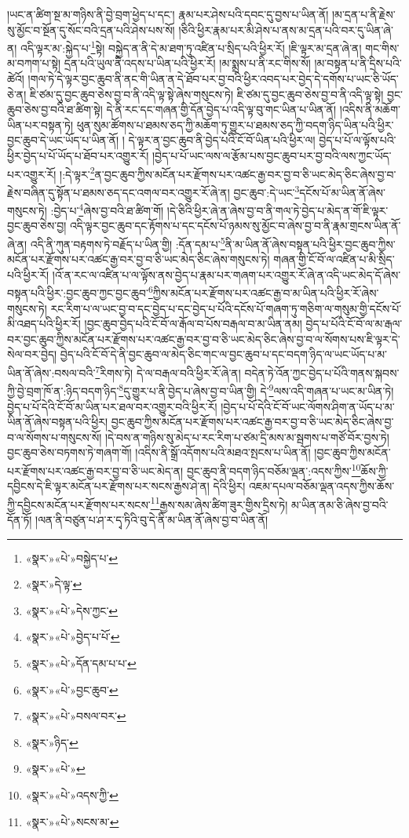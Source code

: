 །ཡང་ན་ཚིག་སྔ་མ་གཉིས་ནི་བྱེ་བྲག་ཕྱེད་པ་དང་། རྣམ་པར་ཤེས་པའི་དབང་དུ་བྱས་པ་ཡིན་ནོ། །མ་དྲན་པ་ནི་རྗེས་སུ་མྱོང་བ་སྔོན་དུ་སོང་བའི་དྲན་པའི་ཤེས་པས་སོ། །ཅིའི་ཕྱིར་རྣམ་པར་མི་ཤེས་པ་ནས་མ་དྲན་པའི་བར་དུ་ཡིན་ཞེ་ན། འདི་ལྟར་མ་:སྐྱེད་པ་\footnote{«སྣར་»«པེ་»བསྐྱེད་པ་}སྟེ། བསྐྱེད་ན་ནི་དེ་མ་ཐག་ཏུ་འཛིན་པ་སྲིད་པའི་ཕྱིར་རོ། །ཇི་ལྟར་མ་དྲན་ཞེ་ན། གང་གིས་མ་བཀག་པ་སྟེ། དྲན་པའི་ཡུལ་ནི་འདས་པ་ཡིན་པའི་ཕྱིར་རོ། །མ་སྨྲས་པ་ནི་རང་གིས་སོ། །མ་བསྟན་པ་ནི་དྲིས་པའི་ཚེའོ། །གལ་ཏེ་དེ་ལྟར་བྱང་ཆུབ་ནི་ནང་གི་ཡིན་ན་དེ་ཐོབ་པར་བྱ་བའི་ཕྱིར་འབད་པར་བྱེད་དེ་དགོས་པ་ཡང་ཅི་ཡོད་ཅེ་ན། ཇི་ཙམ་དུ་བྱང་ཆུབ་ཅེས་བྱ་བ་ནི་འདི་ལྟ་སྟེ་ཞེས་གསུངས་ཏེ། ཇི་ཙམ་དུ་བྱང་ཆུབ་ཅེས་བྱ་བ་ནི་འདི་ལྟ་སྟེ། བྱང་ཆུབ་ཅེས་བྱ་བའི་ཐ་ཚིག་སྟེ། དེ་ནི་རང་དང་གཞན་གྱི་དོན་བྱེད་པ་འདི་ལྟ་བུ་གང་ཡིན་པ་ཡིན་ནོ། །འདིས་ནི་མཆོག་ཡིན་པར་བསྟན་ཏེ། ཕུན་སུམ་ཚོགས་པ་ཐམས་ཅད་ཀྱི་མཆོག་ཏུ་གྱུར་པ་ཐམས་ཅད་ཀྱི་བདག་ཉིད་ཡིན་པའི་ཕྱིར་བྱང་ཆུབ་དེ་ཡང་ཡོད་པ་ཡིན་ནོ། །
དེ་ལྟར་ན་བྱང་ཆུབ་ནི་བྱེད་པའི་ངོ་བོ་ཡིན་པའི་ཕྱིར་ལ། བྱེད་པ་པོ་ལ་ལྟོས་པའི་ཕྱིར་བྱེད་པ་པོ་ཡོད་པ་ཐོབ་པར་འགྱུར་རོ། །བྱེད་པ་པོ་ཡང་ལས་ལ་རྩོམ་པས་བྱང་ཆུབ་པར་བྱ་བའི་ལས་ཀྱང་ཡོད་པར་འགྱུར་རོ། །:དེ་ལྟར་\footnote{«སྣར་»དེ་ལྟ་}ན་བྱང་ཆུབ་ཀྱིས་མངོན་པར་རྫོགས་པར་འཚང་རྒྱ་བར་བྱ་བ་ཅི་ཡང་མེད་ཅིང་ཞེས་བྱ་བ་རྗེས་བཞིན་དུ་སྟོན་པ་ཐམས་ཅད་དང་འགལ་བར་འགྱུར་རོ་ཞེ་ན། བྱང་ཆུབ་:དེ་ཡང་\footnote{«སྣར་»«པེ་»དེས་ཀྱང་}དངོས་པོ་མ་ཡིན་ནོ་ཞེས་གསུངས་ཏེ། :བྱེད་པ་\footnote{«སྣར་»«པེ་»བྱེད་པ་པོ་}ཞེས་བྱ་བའི་ཐ་ཚིག་གོ། །དེ་ཅིའི་ཕྱིར་ཞེ་ན་ཞེས་བྱ་བ་ནི་གལ་ཏེ་བྱེད་པ་མེད་ན་གོ་ཇི་ལྟར་བྱང་ཆུབ་ཅེས་བྱ། འདི་ལྟར་བྱང་ཆུབ་དང་རྟོགས་པ་དང་དངོས་པོ་ཉམས་སུ་མྱོང་བ་ཞེས་བྱ་བ་ནི་རྣམ་གྲངས་ཡིན་ནོ་ཞེ་ན། འདི་ནི་ཀུན་བརྟགས་ཏེ་བརྗོད་པ་ཡིན་གྱི། :དོན་དམ་པ་\footnote{«སྣར་»«པེ་»དོན་དམ་པ་པ་}ནི་མ་ཡིན་ནོ་ཞེས་བསྟན་པའི་ཕྱིར་བྱང་ཆུབ་ཀྱིས་མངོན་པར་རྫོགས་པར་འཚང་རྒྱ་བར་བྱ་བ་ཅི་ཡང་མེད་ཅིང་ཞེས་གསུངས་ཏེ། གཞན་གྱི་ངོ་བོ་ལ་འཛིན་པ་མི་སྲིད་པའི་ཕྱིར་རོ། །འོ་ན་རང་ལ་འཛིན་པ་ལ་ལྟོས་ནས་བྱེད་པ་རྣམ་པར་གཞག་པར་འགྱུར་རོ་ཞེ་ན་འདི་ཡང་མེད་དོ་ཞེས་བསྟན་པའི་ཕྱིར་:བྱང་ཆུབ་ཀྱང་བྱང་ཆུབ་\footnote{«སྣར་»«པེ་»བྱང་ཆུབ་}ཀྱིས་མངོན་པར་རྫོགས་པར་འཚང་རྒྱ་བ་མ་ཡིན་པའི་ཕྱིར་རོ་ཞེས་གསུངས་ཏེ། རང་རིག་པ་ལ་ཡང་བྱ་བ་དང་བྱེད་པ་དང་བྱེད་པ་པོའི་དངོས་པོ་གཞག་ཏུ་གཅིག་ལ་གསུམ་གྱི་དངོས་པོ་མི་འཐད་པའི་ཕྱིར་རོ། །བྱང་ཆུབ་བྱེད་པའི་ངོ་བོ་ལ་རྒོལ་བ་པོས་བརྒལ་བ་མ་ཡིན་ནམ། བྱེད་པ་པོའི་ངོ་བོ་ལ་མ་རྒལ་བར་བྱང་ཆུབ་ཀྱིས་མངོན་པར་རྫོགས་པར་འཚང་རྒྱ་བར་བྱ་བ་ཅི་ཡང་མེད་ཅིང་ཞེས་བྱ་བ་ལ་སོགས་པས་ཇི་ལྟར་དེ་སེལ་བར་བྱེད། བྱེད་པའི་ངོ་བོ་དེ་ནི་བྱང་ཆུབ་ལ་མེད་ཅིང་གང་ལ་བྱང་ཆུབ་པ་དང་བདག་ཉིད་ལ་ཡང་ཡོད་པ་མ་ཡིན་ནོ་ཞེས་:བསལ་བའི་\footnote{«སྣར་»«པེ་»བསལ་བར་}རིགས་ཏེ། དེ་ལ་བརྒལ་བའི་ཕྱིར་རོ་ཞེ་ན། བདེན་ཏེ་འོན་ཀྱང་བྱེད་པ་པོའི་གནས་སྐབས་ཀྱི་བྱེ་བྲག་ཁོ་ན་:ཉིད་བདག་ཉིད་\footnote{«སྣར་»ཉིད་}དུ་གྱུར་པ་ནི་བྱེད་པ་ཞེས་བྱ་བ་ཡིན་གྱི། དེ་\footnote{«སྣར་»«པེ་»}ལས་འདི་གཞན་པ་ཡང་མ་ཡིན་ཏེ། བྱེད་པ་པོ་དེའི་ངོ་བོ་མ་ཡིན་པར་ཐལ་བར་འགྱུར་བའི་ཕྱིར་རོ། །བྱེད་པ་པོ་དེའི་ངོ་བོ་ཡང་ལོགས་ཤིག་ན་ཡོད་པ་མ་ཡིན་ནོ་ཞེས་བསྟན་པའི་ཕྱིར། བྱང་ཆུབ་ཀྱིས་མངོན་པར་རྫོགས་པར་འཚང་རྒྱ་བར་བྱ་བ་ཅི་ཡང་མེད་ཅིང་ཞེས་བྱ་བ་ལ་སོགས་པ་གསུངས་སོ། །དེ་བས་ན་གཉིས་སུ་མེད་པ་རང་རིག་པ་ཙམ་དྲི་མས་མ་སྦགས་པ་གཙོ་བོར་བྱས་ཏེ། བྱང་ཆུབ་ཅེས་བཏགས་ཏེ་གཞག་གོ། །འདིས་ནི་སྒྲོ་འདོགས་པའི་མཐའ་སྤངས་པ་ཡིན་ནོ། །བྱང་ཆུབ་ཀྱིས་མངོན་པར་རྫོགས་པར་འཚང་རྒྱ་བར་བྱ་བ་ཅི་ཡང་མེད་ན། བྱང་ཆུབ་ནི་བདག་ཉིད་བཅོམ་ལྡན་:འདས་ཀྱིས་\footnote{«སྣར་»«པེ་»འདས་ཀྱི་}ཆོས་ཀྱི་དབྱིངས་དེ་ཇི་ལྟར་མངོན་པར་རྫོགས་པར་སངས་རྒྱས་ཤེ་ན། དེའི་ཕྱིར། འཇམ་དཔལ་བཅོམ་ལྡན་འདས་ཀྱིས་ཆོས་ཀྱི་དབྱིངས་མངོན་པར་རྫོགས་པར་སངས་\footnote{«སྣར་»«པེ་»སངས་མ་}རྒྱས་སམ་ཞེས་ཚིག་ཟུར་གྱིས་དྲིས་ཏེ། མ་ཡིན་ནམ་ཅི་ཞེས་བྱ་བའི་དོན་ཏོ། །ལན་ནི་བཙུན་པ་ཤ་ར་དྭ་ཏིའི་བུ་དེ་ནི་མ་ཡིན་ནོ་ཞེས་བྱ་བ་ཡིན་ནོ། 